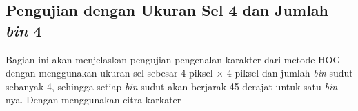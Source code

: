 \subsection{Pengujian dengan Ukuran Sel 4 dan Jumlah \textit{bin} 4}
\noindent Bagian ini akan menjelaskan pengujian pengenalan karakter dari metode HOG dengan menggunakan ukuran sel sebesar 4 piksel $\times$ 4 piksel dan jumlah \textit{bin} sudut sebanyak 4, sehingga setiap \textit{bin} sudut akan berjarak 45 derajat untuk satu \textit{bin}-nya. Dengan menggunakan citra karkater
%
